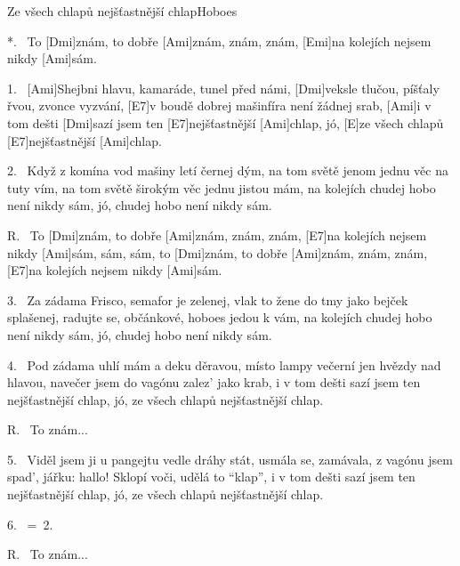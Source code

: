\begin{song}{Ze všech chlapů nejšťastnější chlap}{Hoboes}

\begin{xverse}{*.~}
To [Dmi]znám, to dobře [Ami]znám, znám, znám,
[Emi]na kolejích nejsem nikdy [Ami]sám.
\end{xverse}

\begin{xverse}{1.~}
[Ami]Shejbni hlavu, kamaráde, tunel před námi,
[Dmi]veksle tlučou, píšťaly řvou, zvonce vyzvání,
[E7]v boudě dobrej mašinfíra není žádnej srab,
[Ami]i v tom dešti [Dmi]sazí jsem ten [E7]nejšťastnější [Ami]chlap,
jó, [E]ze všech chlapů [E7]nejšťastnější [Ami]chlap.
\end{xverse}

\begin{xverse}{2.~}
Když z komína vod mašiny letí černej dým,
na tom světě jenom jednu věc na tuty vím,
na tom světě širokým věc jednu jistou mám,
na kolejích chudej hobo není nikdy sám,
jó, chudej hobo není nikdy sám.
\end{xverse}

\begin{xverse}{R.~}
To [Dmi]znám, to dobře [Ami]znám, znám, znám,
[E7]na kolejích nejsem nikdy [Ami]sám, sám, sám,
to [Dmi]znám, to dobře [Ami]znám, znám, znám,
[E7]na kolejích nejsem nikdy [Ami]sám.
\end{xverse}

\begin{xverse}{3.~}
Za zádama Frisco, semafor je zelenej,
vlak to žene do tmy jako bejček splašenej,
radujte se, občánkové, hoboes jedou k vám,
na kolejích chudej hobo není nikdy sám,
jó, chudej hobo není nikdy sám.
\end{xverse}

\begin{xverse}{4.~}
Pod zádama uhlí mám a deku děravou,
místo lampy večerní jen hvězdy nad hlavou,
navečer jsem do vagónu zalez' jako krab,
i v tom dešti sazí jsem ten nejšťastnější chlap,
jó, ze všech chlapů nejšťastnější chlap.
\end{xverse}

\begin{xverse}{R.~}
To znám...
\end{xverse}

\begin{xverse}{5.~}
Viděl jsem ji u pangejtu vedle dráhy stát,
usmála se, zamávala, z vagónu jsem spad',
jářku: hallo! Sklopí voči, udělá to ``klap'',
i v tom dešti sazí jsem ten nejšťastnější chlap,
jó, ze všech chlapů nejšťastnější chlap.
\end{xverse}

\begin{xverse}{6.~}
=\ 2.
\end{xverse}

\begin{xverse}{R.~}
To znám...
\end{xverse}

\end{song}